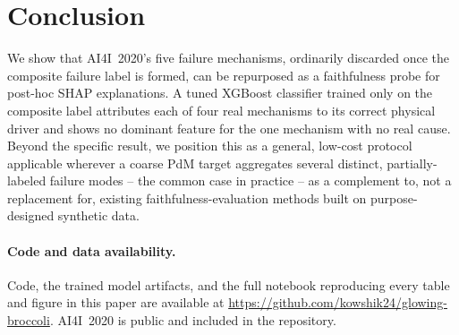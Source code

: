 \documentclass[11pt]{article}
\begin{document}
\section{Conclusion}
We show that AI4I~2020's five failure mechanisms, ordinarily discarded once the composite failure
label is formed, can be repurposed as a faithfulness probe for post-hoc SHAP explanations. A tuned
XGBoost classifier trained only on the composite label attributes each of four real mechanisms to
its correct physical driver and shows no dominant feature for the one mechanism with no real cause.
Beyond the specific result, we position this as a general, low-cost protocol applicable wherever a
coarse PdM target aggregates several distinct, partially-labeled failure modes -- the common case in
practice -- as a complement to, not a replacement for, existing faithfulness-evaluation methods built
on purpose-designed synthetic data.

\paragraph{Code and data availability.} Code, the trained model artifacts, and the full notebook
reproducing every table and figure in this paper are available at
\url{https://github.com/kowshik24/glowing-broccoli}. AI4I~2020 is public
\citep{matzka2020explainable} and included in the repository.



\end{document}
